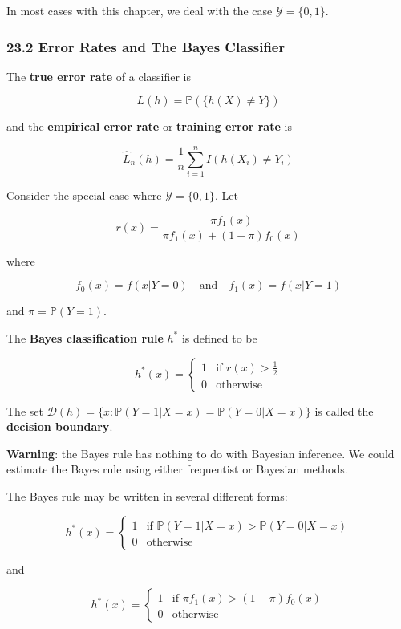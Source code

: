 In most cases with this chapter, we deal with the case
\(\mathcal{Y} = \{ 0, 1 \}\).

\subsubsection{23.2 Error Rates and The Bayes Classifier}\label{error-rates-and-the-bayes-classifier}

The \textbf{true error rate} of a classifier is

\[ L(h) = \mathbb{P}( \{ h(X) \neq Y\} ) \]

and the \textbf{empirical error rate} or \textbf{training error rate} is

\[ \hat{L}_n(h) = \frac{1}{n} \sum_{i=1}^n I(h(X_i) \neq Y_i) \]

Consider the special case where \(\mathcal{Y} = \{0, 1\}\). Let

\[ r(x) = \frac{\pi f_1(x)}{\pi f_1(x) + (1 - \pi) f_0(x)} \]

where

\[ f_0(x) = f(x | Y = 0)
\quad \text{and} \quad
f_1(x) = f(x | Y = 1)\]

and \(\pi = \mathbb{P}(Y = 1)\).

The \textbf{Bayes classification rule} \(h^*\) is defined to be

\[
h^*(x) = \begin{cases}
1 & \text{if } r(x) > \frac{1}{2} \\
0 & \text{otherwise}
\end{cases}
\]

The set
\(\mathcal{D}(h) = \{ x : \mathbb{P}(Y = 1 | X = x) = \mathbb{P}(Y = 0 | X = x) \}\)
is called the \textbf{decision boundary}.

\textbf{Warning}: the Bayes rule has nothing to do with Bayesian
inference. We could estimate the Bayes rule using either frequentist or
Bayesian methods.

The Bayes rule may be written in several different forms:

\[
h^*(x) = \begin{cases}
1 & \text{if } \mathbb{P}(Y = 1 | X = x) > \mathbb{P}(Y = 0 | X  = x)\\
0 & \text{otherwise}
\end{cases}
\]

and

\[
h^*(x) = \begin{cases}
1 & \text{if } \pi f_1(x) > (1 - \pi) f_0(x) \\
0 & \text{otherwise}
\end{cases}
\]

